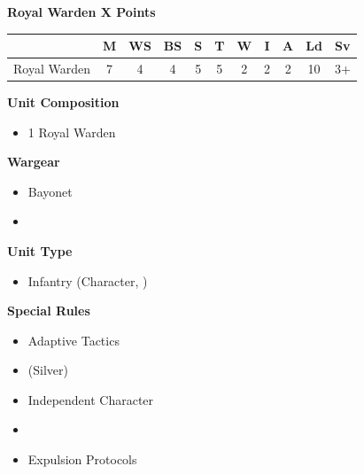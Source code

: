 \newpage
\subsubsection[Royal Warden]{}
\hspace{0.5em}
\begin{minipage}[t]{0.72\textwidth}
	{\large \textbf{Royal Warden \dotfill X Points}}
	
	\begin{tabular}{m{160 pt} *{10}{c}}
		& M & WS & BS & S & T & W & I & A & Ld & Sv \\
		\hline
		Royal Warden & 7 & 4 & 4 & 5 & 5 & 2 & 2 & 2 & 10 & 3+ \\
	\end{tabular}
	\small
	\begin{minipage}[t]{0.5\textwidth}
		\begin{flushleft}
		\vspace*{2em}
		\textbf{Unit Composition}
		\begin{itemize}
			\item 1 Royal Warden
		\end{itemize}
		
		\textbf{Wargear}
		\begin{itemize}
			\item Bayonet
			\item {}
		\end{itemize}
		\end{flushleft}
	\end{minipage}
	\begin{minipage}{0.5\textwidth}
		\vspace*{2em}
		\textbf{Unit Type}
		\begin{itemize}
			\item Infantry (Character, )
		\end{itemize}
		
		\textbf{Special Rules}
		\begin{itemize}
			\item Adaptive Tactics
			\item {} (Silver)
			\item Independent Character
			\item {}
			\item Expulsion Protocols
		\end{itemize}
	\end{minipage}
	

\end{minipage}
